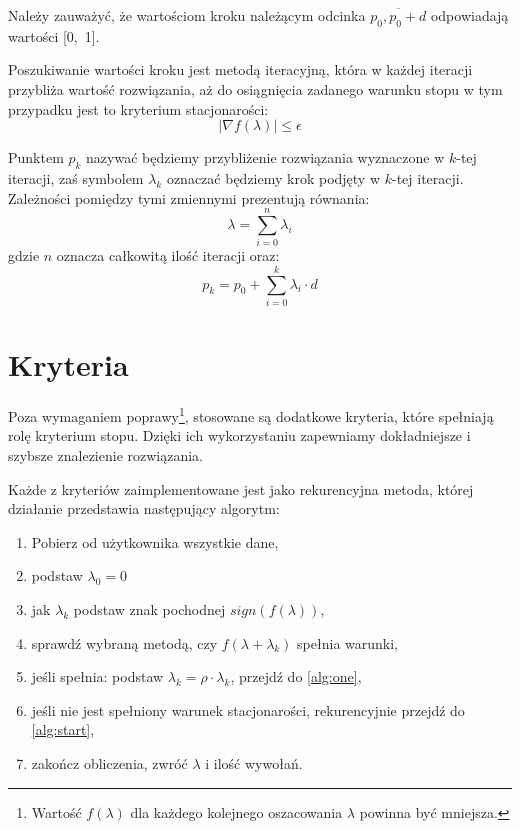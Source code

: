 \documentclass{classrep}
\begin{document}
Należy zauważyć, że wartościom kroku należącym odcinka $\overline{p_0, p_0 + d}$ odpowiadają wartości [0,~1].

Poszukiwanie wartości kroku jest metodą iteracyjną, która w każdej iteracji przybliża wartość rozwiązania, aż do osiągnięcia zadanego warunku stopu \ppauza w tym przypadku jest to kryterium stacjonarości:
\begin{equation}
 \lvert\nabla f(\lambda)\rvert \leq \epsilon
\end{equation}

Punktem $p_k$ nazywać będziemy przybliżenie rozwiązania wyznaczone w $k$-tej iteracji, zaś symbolem $\lambda_k$ oznaczać będziemy krok podjęty w $k$-tej iteracji. Zależności pomiędzy tymi zmiennymi prezentują równania:
\begin{equation}
 \lambda = \displaystyle\sum\limits_{i=0}^n \lambda_i
\end{equation}
gdzie $n$ oznacza całkowitą ilość iteracji oraz:
\begin{equation}
 p_k = p_0 + \displaystyle\sum\limits_{i=0}^k \lambda_i \cdot d
\end{equation}


\section{Kryteria}
Poza wymaganiem poprawy\footnote{Wartość $f(\lambda)$ dla każdego kolejnego oszacowania $\lambda$ powinna być mniejsza.}, stosowane są dodatkowe kryteria, które spełniają rolę kryterium stopu. Dzięki ich wykorzystaniu zapewniamy dokładniejsze i szybsze znalezienie rozwiązania.

Każde z kryteriów zaimplementowane jest jako rekurencyjna metoda, której działanie przedstawia następujący algorytm:
\begin{enumerate}
 \item Pobierz od użytkownika wszystkie dane,
 \item podstaw $\lambda_0 = 0$
 \item jak $\lambda_k$ podstaw znak pochodnej $sign(f(\lambda))$,\label{alg:start}
 \item sprawdź wybraną metodą, czy $f(\lambda + \lambda_k)$ spełnia warunki,\label{alg:one}
 \item jeśli spełnia: podstaw $\lambda_k = \rho \cdot \lambda_k$, przejdź do \ref{alg:one},
 \item jeśli nie jest spełniony warunek stacjonarości, rekurencyjnie przejdź do \ref{alg:start},
 \item zakończ obliczenia, zwróć $\lambda$ i ilość wywołań.
\end{enumerate}
\end{document}
